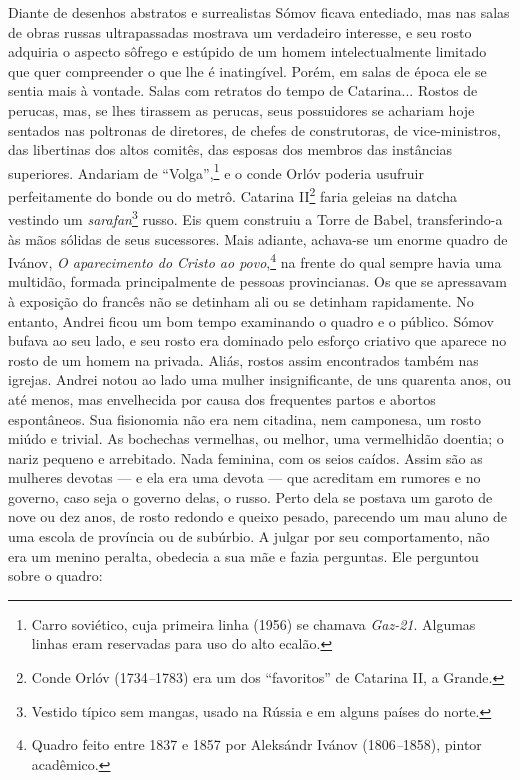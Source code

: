 Diante de desenhos abstratos e surrealistas Sómov ficava entediado, mas
nas salas de obras russas ultrapassadas mostrava um verdadeiro
interesse, e seu rosto adquiria o aspecto sôfrego e estúpido de um homem
intelectualmente limitado que quer compreender o que lhe é inatingível.
Porém, em salas de época ele se sentia mais à vontade. Salas com
retratos do tempo de Catarina... Rostos de perucas, mas, se lhes
tirassem as perucas, seus possuidores se achariam hoje sentados nas
poltronas de diretores, de chefes de construtoras, de vice-ministros,
das libertinas dos altos comitês, das esposas dos membros das instâncias
superiores. Andariam de ``Volga'',\footnote{Carro soviético, cuja
  primeira linha (1956) se chamava \emph{Gaz-21}. Algumas linhas eram
  reservadas para uso do alto ecalão.} e o conde Orlóv poderia usufruir
perfeitamente do bonde ou do metrô. Catarina II\footnote{Conde Orlóv
  (1734\emph{--}1783) era um dos ``favoritos'' de Catarina II, a Grande.}
faria geleias na datcha vestindo um \emph{sarafan}\footnote{Vestido
  típico sem mangas, usado na Rússia e em alguns países do norte.}
russo. Eis quem construiu a Torre de Babel, transferindo-a às mãos
sólidas de seus sucessores. Mais adiante, achava-se um enorme quadro de
Ivánov, \emph{O aparecimento do Cristo ao povo},\footnote{Quadro feito
  entre 1837 e 1857 por Aleksándr Ivánov (1806\emph{--}1858), pintor
  acadêmico.} na frente do qual sempre havia uma multidão, formada
principalmente de pessoas provincianas. Os que se apressavam à exposição
do francês não se detinham ali ou se detinham rapidamente. No entanto,
Andrei ficou um bom tempo examinando o quadro e o público. Sómov bufava
ao seu lado, e seu rosto era dominado pelo esforço criativo que aparece
no rosto de um homem na privada. Aliás, rostos assim encontrados também
nas igrejas. Andrei notou ao lado uma mulher insignificante, de uns
quarenta anos, ou até menos, mas envelhecida por causa dos frequentes
partos e abortos espontâneos. Sua fisionomia não era nem citadina, nem
camponesa, um rosto miúdo e trivial. As bochechas vermelhas, ou melhor,
uma vermelhidão doentia; o nariz pequeno e arrebitado. Nada feminina,
com os seios caídos. Assim são as mulheres devotas --- e ela era uma
devota --- que acreditam em rumores e no governo, caso seja o governo
delas, o russo. Perto dela se postava um garoto de nove ou dez anos, de
rosto redondo e queixo pesado, parecendo um mau aluno de uma escola de
província ou de subúrbio. A julgar por seu comportamento, não era um
menino peralta, obedecia a sua mãe e fazia perguntas. Ele perguntou
sobre o quadro:

